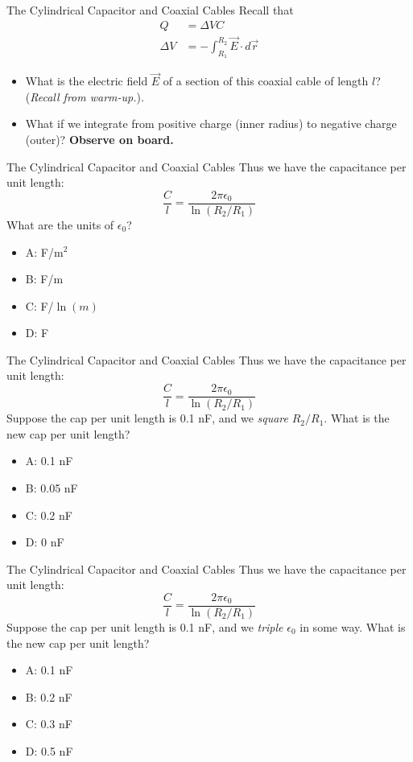 \documentclass{beamer}
\begin{document}
\begin{frame}{The Cylindrical Capacitor and Coaxial Cables}
Recall that
\begin{align}
Q &= \Delta VC \\
\Delta V &= - \int_{R_1}^{R_2} \vec{E} \cdot d\vec{r}
\end{align}
\begin{itemize}
\item What is the electric field $\vec{E}$ of a section of this coaxial cable of length $l$? (\textit{Recall from warm-up.}).
\item What if we integrate from positive charge (inner radius) to negative charge (outer)? \textbf{Observe on board.}
\end{itemize}
\end{frame}

\begin{frame}{The Cylindrical Capacitor and Coaxial Cables}
Thus we have the capacitance per unit length:
\begin{equation}
\boxed{
\frac{C}{l} = \frac{2\pi\epsilon_0}{\ln(R_2/R_1)}
}
\end{equation}
What are the units of $\epsilon_0$?
\begin{itemize}
\item A: F/m$^2$
\item B: F/m
\item C: F/$\ln(m)$
\item D: F
\end{itemize}
\end{frame}

\begin{frame}{The Cylindrical Capacitor and Coaxial Cables}
Thus we have the capacitance per unit length:
\begin{equation}
\boxed{
\frac{C}{l} = \frac{2\pi\epsilon_0}{\ln(R_2/R_1)}
}
\end{equation}
Suppose the cap per unit length is 0.1 nF, and we \textit{square} $R_2/R_1$.  What is the new cap per unit length?
\begin{itemize}
\item A: 0.1 nF
\item B: 0.05 nF
\item C: 0.2 nF
\item D: 0 nF
\end{itemize}
\end{frame}

\begin{frame}{The Cylindrical Capacitor and Coaxial Cables}
Thus we have the capacitance per unit length:
\begin{equation}
\boxed{
\frac{C}{l} = \frac{2\pi\epsilon_0}{\ln(R_2/R_1)}
}
\end{equation}
Suppose the cap per unit length is 0.1 nF, and we \textit{triple} $\epsilon_0$ in some way.  What is the new cap per unit length?
\begin{itemize}
\item A: 0.1 nF
\item B: 0.2 nF
\item C: 0.3 nF
\item D: 0.5 nF
\end{itemize}
\end{frame}
\end{document}
